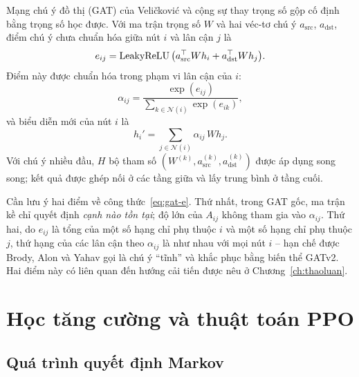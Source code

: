 Mạng chú ý đồ thị (GAT) của Veličković và cộng sự \cite{velickovic2018} thay trọng số gộp cố định bằng trọng số học được. Với ma trận trọng số $W$ và hai véc-tơ chú ý $a_{\mathrm{src}}$, $a_{\mathrm{dst}}$, điểm chú ý chưa chuẩn hóa giữa nút $i$ và lân cận $j$ là
\begin{equation}
e_{ij}=\operatorname{LeakyReLU}\big(a_{\mathrm{src}}^{\top} Wh_i+a_{\mathrm{dst}}^{\top} Wh_j\big).
\label{eq:gat-e}
\end{equation}
Điểm này được chuẩn hóa trong phạm vi lân cận của $i$:
\begin{equation}
\alpha_{ij}=\frac{\exp(e_{ij})}{\sum_{k\in\mathcal{N}(i)}\exp(e_{ik})},
\label{eq:gat-alpha}
\end{equation}
và biểu diễn mới của nút $i$ là
\begin{equation}
h_i'=\sum_{j\in\mathcal{N}(i)}\alpha_{ij}\,Wh_j .
\label{eq:gat-h}
\end{equation}
Với chú ý nhiều đầu, $H$ bộ tham số $(W^{(k)},a^{(k)}_{\mathrm{src}},a^{(k)}_{\mathrm{dst}})$ được áp dụng song song; kết quả được ghép nối ở các tầng giữa và lấy trung bình ở tầng cuối.

Cần lưu ý hai điểm về công thức~\eqref{eq:gat-e}. Thứ nhất, trong GAT gốc, ma trận kề chỉ quyết định \emph{cạnh nào tồn tại}; độ lớn của $A_{ij}$ không tham gia vào $\alpha_{ij}$. Thứ hai, do $e_{ij}$ là tổng của một số hạng chỉ phụ thuộc $i$ và một số hạng chỉ phụ thuộc $j$, thứ hạng của các lân cận theo $\alpha_{ij}$ là như nhau với mọi nút $i$ -- hạn chế được Brody, Alon và Yahav \cite{brody2022} gọi là chú ý ``tĩnh'' và khắc phục bằng biến thể GATv2. Hai điểm này có liên quan đến hướng cải tiến được nêu ở Chương~\ref{ch:thaoluan}.

\section{Học tăng cường và thuật toán PPO}
\label{sec:lt-rl}

\subsection{Quá trình quyết định Markov}

